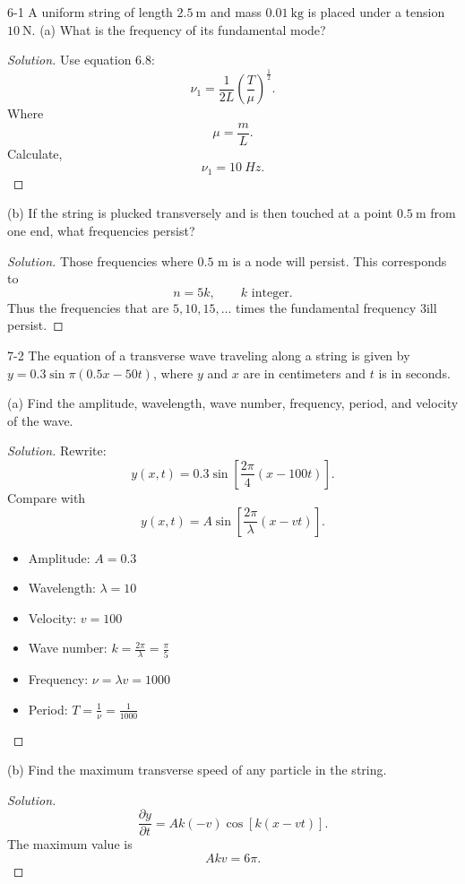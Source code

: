 
6-1 A uniform string of length $2.5 \mathrm{~m}$ and mass $0.01 \mathrm{~kg}$ is placed under a tension $10 \mathrm{~N}$.
(a) What is the frequency of its fundamental mode?
\begin{proof}[Solution]
	Use equation 6.8:
	\[
		\nu_1 = \frac{1}{2 L}\left( \frac{T}{\mu} \right)^{\frac{1}{2}} 
	.\] 
	Where
	\[
		\mu = \frac{m}{L}
	.\] 
	Calculate,
	\[
		\nu_1 = \SI{10}{Hz}
	.\] 
\end{proof}

(b) If the string is plucked transversely and is then touched at a point $0.5 \mathrm{~m}$ from one end, what frequencies persist?
\begin{proof}[Solution]
	Those frequencies where  $0.5$ m is a node will persist. This corresponds to 
	\[
		n = 5 k, \qquad k \text{ integer}
	.\] 
	Thus the frequencies that are $5, 10, 15, \ldots$ times the fundamental frequency 3ill persist.
\end{proof}


\newpage

7-2 The equation of a transverse wave traveling along a string is given by $y=0.3 \sin \pi(0.5 x-50 t)$, where $y$ and $x$ are in centimeters and $t$ is in seconds.

(a) Find the amplitude, wavelength, wave number, frequency, period, and velocity of the wave.
\begin{proof}[Solution]
	Rewrite:
	\[
		y(x,t) = 0.3 \sin \left[ \frac{2 \pi}{4}\left( x - 100 t \right)  \right] 
	.\] 
	Compare with
	\[
		y(x,t) = A \sin\left[ \frac{2 \pi}{\lambda}(x - v t) \right] 
	.\] 
	\begin{itemize}
		\item Amplitude: $A = 0.3$
		\item Wavelength: $\lambda = 10$
		\item Velocity: $v = 100$
		\item Wave number:  $k = \frac{2 \pi}{\lambda} = \frac{\pi}{5}$ 
		\item Frequency: $\nu = \lambda v = 1000$
		\item Period: $T = \frac{1}{\nu} = \frac{1}{1000}$
	\end{itemize}
\end{proof}

(b) Find the maximum transverse speed of any particle in the string.
\begin{proof}[Solution]
	\[
		\frac{\partial y}{\partial t}  = A k(-v) \cos \left[ k(x - v t) \right] 
	.\] 
	The maximum value is
	\[
		A k v = 6 \pi
	.\] 
\end{proof}

